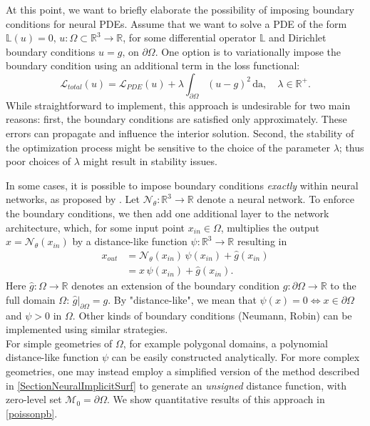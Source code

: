 \documentclass[12pt,openany]{book}
\newcommand{\R}{\mathbb{R}}
\theoremstyle{plainnormal}
\theoremstyle{remark}
\begin{document}
At this point, we want to briefly elaborate the possibility of imposing boundary conditions for neural PDEs. Assume that we want to solve a PDE of the form $\mathbb{L}(u) = 0, \, u:\Omega\subset\R^3\rightarrow\R$, for some differential operator $\mathbb{L}$ and Dirichlet boundary conditions $ u = g \text{, on }\partial\Omega$. One option is to variationally impose the boundary condition using an additional term in the loss functional: $$\mathcal L_{total}(u) = \mathcal{L}_{PDE}(u) + \lambda \int_{\partial \Omega} (u - g) ^2\, \mathrm{da}, \quad \lambda \in\R^+.$$
While straightforward to implement, this approach is undesirable for two main reasons: first, the boundary conditions are satisfied only approximately. These errors can propagate and influence the interior solution.  Second, the stability of the optimization process might be sensitive to the choice of the parameter $\lambda$; thus poor choices of $\lambda$ might result in stability issues.\par
In some cases, it is possible to impose boundary conditions \emph{exactly} within neural networks, as proposed by \cite{BERRONE2023e18820}. Let $\mathcal{N}_\theta: \R^3 \rightarrow \R$ denote a neural network. To enforce the boundary conditions, we then add one additional layer to the network architecture, which, for some input point $x_{in} \in \Omega$, multiplies the output $x= \mathcal N _\theta(x_{in})$  by a distance-like function $\psi: \R^3 \rightarrow\R$ resulting in 
\begin{align*}
    x_{out} &= \mathcal N_\theta(x_{in})\,\psi(x_{in}) + \hat g(x_{in}) \\&= x\,\psi(x_{in})+ \hat g(x_{in}).
\end{align*}
Here $\hat{g}: \Omega \rightarrow\R$ denotes an extension of the boundary condition $g: \partial \Omega \rightarrow \R $ to the full domain $\Omega$: $\hat g|_{\partial \Omega} = g$. By "distance-like", we mean that $\psi(x) = 0 \Leftrightarrow x \in \partial  \Omega$ and $\psi > 0$ in $\Omega$. Other kinds of boundary conditions (Neumann, Robin) can be implemented using similar strategies. \\
For simple geometries of $\Omega$, for example polygonal domains, a polynomial distance-like function $\psi$ can be easily constructed analytically. For more complex geometries, one may instead employ a simplified version of the method described in \cref{SectionNeuralImplicitSurf} to generate an \emph{unsigned} distance function, with zero-level set $\mathcal M_0 = \partial \Omega$. We show quantitative results of this approach in \cref{poissonpb}.
\end{document}
